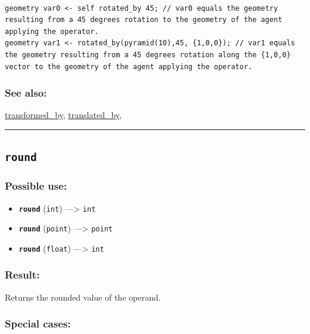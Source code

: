 \documentclass[]{book}
\providecommand{\tightlist}{%
  \setlength{\itemsep}{0pt}\setlength{\parskip}{0pt}}
\theoremstyle{definition}
\theoremstyle{definition}
\theoremstyle{definition}
\theoremstyle{remark}
\begin{document}
\begin{verbatim}
 
geometry var0 <- self rotated_by 45; // var0 equals the geometry resulting from a 45 degrees rotation to the geometry of the agent applying the operator. 
geometry var1 <- rotated_by(pyramid(10),45, {1,0,0}); // var1 equals the geometry resulting from a 45 degrees rotation along the {1,0,0} vector to the geometry of the agent applying the operator.
\end{verbatim}

\subsubsection{See also:}\label{see-also-179}

\href{operators-s-to-z.html\#transformed_by}{transformed\_by},
\href{operators-s-to-z.html\#translated_by}{translated\_by},

\begin{center}\rule{0.5\linewidth}{\linethickness}\end{center}

\subsection{\texorpdfstring{\texttt{round}}{round}}\label{round}

\subsubsection{Possible use:}\label{possible-use-445}

\begin{itemize}
\tightlist
\item
  \textbf{\texttt{round}} (\texttt{int}) ---\textgreater{} \texttt{int}
\item
  \textbf{\texttt{round}} (\texttt{point}) ---\textgreater{}
  \texttt{point}
\item
  \textbf{\texttt{round}} (\texttt{float}) ---\textgreater{}
  \texttt{int}
\end{itemize}

\subsubsection{Result:}\label{result-431}

Returns the rounded value of the operand.

\subsubsection{Special cases:}\label{special-cases-120}
\end{document}
